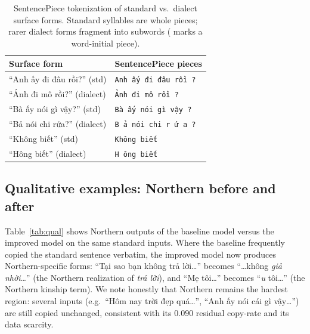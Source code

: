 \documentclass[11pt]{article}
\newcommand{\spm}{{\dejavumono\symbol{"2581}}}
\begin{document}
\begin{table}[t]
  \centering
  \footnotesize
  \caption{SentencePiece tokenization of standard vs.\ dialect surface forms.
  Standard syllables are whole pieces; rarer dialect forms fragment into subwords
  (\texttt{\spm} marks a word-initial piece).}
  \label{tab:tok}
  \begin{tabular}{l l}
    \toprule
    \textbf{Surface form} & \textbf{SentencePiece pieces}\\
    \midrule
    ``Anh ấy đi đâu rồi?'' (std) & \texttt{\spm Anh \spm ấy \spm đi \spm đâu \spm rồi ?}\\
    ``Ảnh đi mô rồi?'' (dialect) & \texttt{\spm Ảnh \spm đi \spm mô \spm rồi ?}\\
    ``Bà ấy nói gì vậy?'' (std)  & \texttt{\spm Bà \spm ấy \spm nói \spm gì \spm vậy ?}\\
    ``Bả nói chi rứa?'' (dialect)& \texttt{\spm B ả \spm nói \spm chi \spm r ứ a ?}\\
    ``Không biết'' (std)         & \texttt{\spm Không \spm biết}\\
    ``Hông biết'' (dialect)      & \texttt{\spm H ông \spm biết}\\
    \bottomrule
  \end{tabular}
\end{table}

\subsection{Qualitative examples: Northern before and after}
\label{sec:analysis-qual}

Table~\ref{tab:qual} shows Northern outputs of the baseline model versus the
improved model on the same standard inputs. Where the baseline frequently copied
the standard sentence verbatim, the improved model now produces Northern-specific
forms: ``Tại sao bạn không trả lời\dots'' becomes ``\dots không \emph{giả nhời}\dots''
(the Northern realization of \emph{trả lời}), and ``Mẹ tôi\dots'' becomes
``\emph{u} tôi\dots'' (the Northern kinship term). We note honestly that Northern
remains the hardest region: several inputs (e.g.\ ``Hôm nay trời đẹp quá\dots'',
``Anh ấy nói cái gì vậy\dots'') are still copied unchanged, consistent with its
$0.090$ residual copy-rate and its data scarcity.
\end{document}
